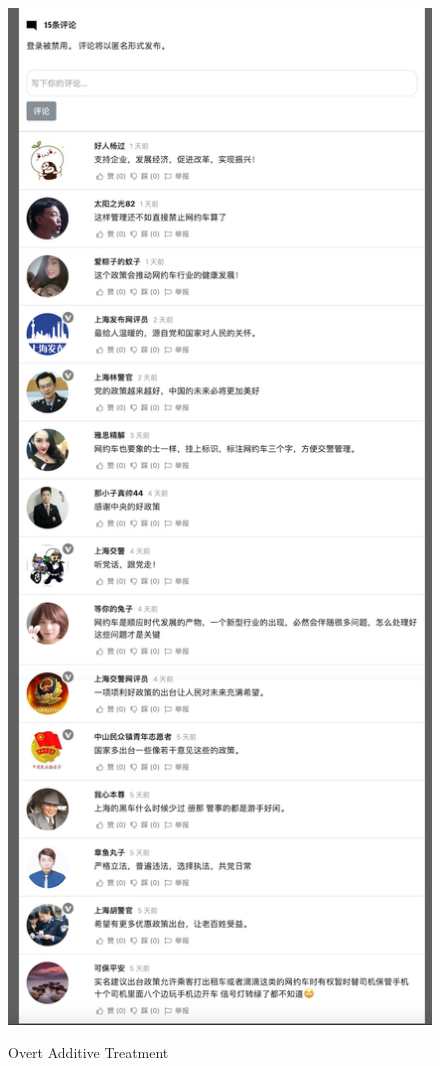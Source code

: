 \documentclass[11pt]{article}
\begin{document}
\begin{figure}
  \centering
  \caption{Overt Additive Treatment}
  \vspace{1em}
  \includegraphics[height=.9\textheight]{figures/overt_additive.png}
  \label{overt_additive}
\end{figure}
\end{document}
